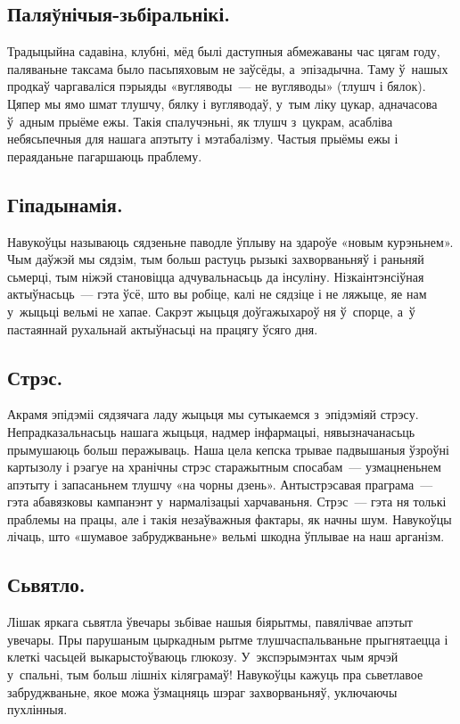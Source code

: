 \subsection{Паляўнічыя-зьбіральнікі.}
Традыцыйна садавіна, клубні, мёд былі даступныя абмежаваны час цягам году, паляваньне таксама было пасьпяховым не заўсёды, а~эпізадычна. Таму ў~нашых продкаў чаргаваліся пэрыяды «вугляводы~--- не вугляводы» (тлушч і бялок). Цяпер мы ямо шмат тлушчу, бялку і вугляводаў, у~тым ліку цукар, адначасова ў~адным прыёме ежы. Такія спалучэньні, як тлушч з~цукрам, асабліва небясьпечныя для нашага апэтыту і мэтабалізму. Частыя прыёмы ежы і пераяданьне пагаршаюць праблему.

\subsection{Гіпадынамія.}
Навукоўцы называюць сядзеньне паводле ўплыву на здароўе «новым курэньнем». Чым даўжэй мы сядзім, тым больш растуць рызыкі захворваньняў і раньняй сьмерці, тым ніжэй становіцца адчувальнасьць да інсуліну. Нізкаінтэнсіўная актыўнасьць~--- гэта ўсё, што вы робіце, калі не сядзіце і не ляжыце, яе нам у~жыцьці вельмі не хапае. Сакрэт жыцьця доўгажыхароў ня ў~спорце, а~ў пастаяннай рухальнай актыўнасьці на працягу ўсяго дня.

\subsection{Стрэс.}
Акрамя эпідэміі сядзячага ладу жыцьця мы сутыкаемся з~эпідэміяй стрэсу. Непрадказальнасьць нашага жыцьця, надмер інфармацыі, нявызначанасьць прымушаюць больш перажываць. Наша цела кепска трывае падвышаныя ўзроўні картызолу і рэагуе на хранічны стрэс старажытным спосабам~--- узмацненьнем апэтыту і запасаньнем тлушчу «на чорны дзень». Антыстрэсавая праграма~--- гэта абавязковы кампанэнт у~нармалізацыі харчаваньня. Стрэс~--- гэта ня толькі праблемы на працы, але і такія незаўважныя фактары, як начны шум. Навукоўцы лічаць, што «шумавое забруджваньне» вельмі шкодна ўплывае на наш арганізм.

\subsection{Сьвятло.}
Лішак яркага сьвятла ўвечары зьбівае нашыя біярытмы, павялічвае апэтыт увечары. Пры парушаным цыркадным рытме тлушчаспальваньне прыгнятаецца і клеткі часьцей выкарыстоўваюць глюкозу. У~экспэрымэнтах чым ярчэй у~спальні, тым больш лішніх кіляграмаў! Навукоўцы кажуць пра сьветлавое забруджваньне, якое можа ўзмацняць шэраг захворваньняў, уключаючы пухлінныя.

